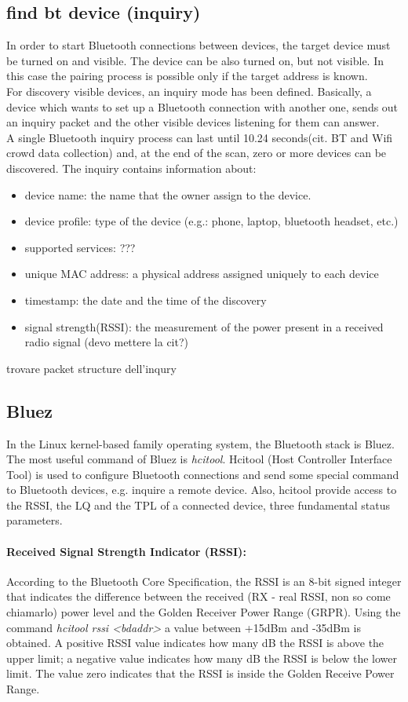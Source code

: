 \subsection{find bt device (inquiry)}
In order to start Bluetooth connections between devices, the target device must be turned on and visible. The device can be also turned on, but not visible. In this case the pairing process is possible only if the target address is known.\\
For discovery visible devices, an inquiry mode has been defined. Basically, a device which wants to set up a Bluetooth connection with another one, sends out an inquiry packet and the other visible devices listening for them can answer.\\
A single Bluetooth inquiry process can last until 10.24 seconds(cit. BT and Wifi crowd data collection) and, at the end of the scan, zero or more devices can be discovered. 
The inquiry contains information about:
\begin{itemize}
\item device name: the name that the owner assign to the device.
\item device profile: type of the device (e.g.: phone, laptop, bluetooth headset, etc.)
\item supported services: ???
\item unique MAC address: a physical address assigned uniquely to each device
\item timestamp: the date and the time of the discovery
\item signal strength(RSSI): the measurement of the power present in a received radio signal (devo mettere la cit?)
\end{itemize}
trovare packet structure dell'inqury

\subsection{Bluez}
In the Linux kernel-based family operating system, the Bluetooth stack is Bluez.
The most useful command of Bluez is \textit{hcitool}. Hcitool (Host Controller Interface Tool) is used to configure Bluetooth connections and send some special command to Bluetooth devices, e.g. inquire a remote device.
Also, hcitool provide access to the RSSI, the LQ and the TPL of a connected device, three fundamental status parameters.

\paragraph{Received Signal Strength Indicator (RSSI):}
According to the Bluetooth Core Specification, the RSSI is an 8-bit signed integer that indicates the difference between the received (RX - real RSSI, non so come chiamarlo) power level and the Golden Receiver Power Range (GRPR). 
Using the command \textit{hcitool rssi <bdaddr>} a value between +15dBm and -35dBm is obtained. 
A positive RSSI value indicates how many dB the RSSI is above the upper limit; a negative value indicates how many dB the RSSI is below the lower limit. The value zero indicates that the RSSI is inside the Golden Receive Power Range.

